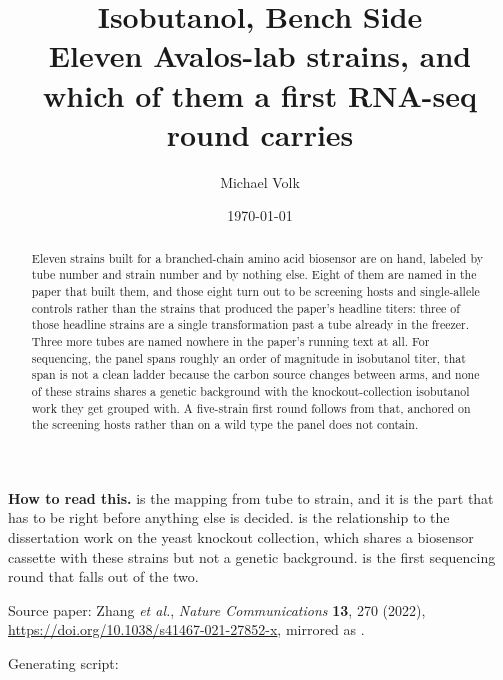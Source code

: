 \documentclass[10pt,a4paper]{article}
\title{\vspace{-1.5em}Isobutanol, Bench Side\\
  {\large Eleven Avalos-lab strains, and which of them a first RNA-seq round carries}}
\author{Michael Volk}
\date{\today}
\begin{document}
\maketitle
\thispagestyle{empty}

\begin{abstract}
\noindent
Eleven strains built for a branched-chain amino acid biosensor are on hand,
labeled by tube number and strain number and by nothing else. Eight of them are
named in the paper that built them, and those eight turn out to be screening
hosts and single-allele controls rather than the strains that produced the
paper's headline titers: three of those headline strains are a single
transformation past a tube already in the freezer. Three more tubes are named
nowhere in the paper's running text at all. For sequencing, the panel spans
roughly an order of magnitude in isobutanol titer, that span is not a clean
ladder because the carbon source changes between arms, and none of these strains
shares a genetic background with the knockout-collection isobutanol work they
get grouped with. A five-strain first round follows from that, anchored on the
screening hosts rather than on a wild type the panel does not contain.
\end{abstract}

\vspace{0.5em}
{\small\color{tcgray}
\textbf{How to read this.}  is the mapping from tube to strain,
and it is the part that has to be right before anything else is decided.
 is the relationship to the dissertation work on the yeast
knockout collection, which shares a biosensor cassette with these strains but
not a genetic background.  is the first sequencing round that
falls out of the two.\par\smallskip

Source paper: Zhang \textit{et al.}, \textit{Nature Communications} \textbf{13},
270 (2022), \url{https://doi.org/10.1038/s41467-021-27852-x}, mirrored as
.\par
Generating script: \par}

\vspace{1em}
\tccontents





\clearpage
\small

\end{document}
